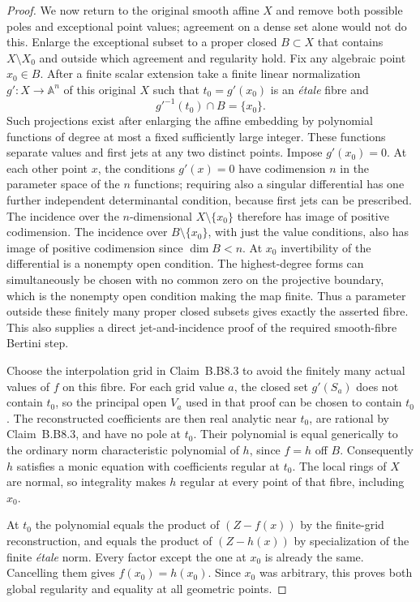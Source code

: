 \begin{proof}
We now return to the original smooth affine $X$ and remove both
possible poles and exceptional point values; agreement on a dense
set alone would not do this.  Enlarge the exceptional subset to a
proper closed $B\subset X$ that contains $X\setminus X_0$ and
outside which agreement and regularity hold.  Fix any algebraic
point $x_0\in B$.  After a finite scalar extension take a finite
linear normalization $g':X\to\mathbb A^n$ of this original $X$
such that
$t_0=g'(x_0)$ is an \emph{\'etale} fibre and
\[
                g'^{-1}(t_0)\cap B=\{x_0\}.
\]
Such projections exist after enlarging the affine embedding by
polynomial functions of degree at most a fixed sufficiently large
integer.  These functions separate values and first jets at any
two distinct points.  Impose $g'(x_0)=0$.  At each other point
$x$, the conditions $g'(x)=0$ have codimension $n$ in the
parameter space of the $n$ functions; requiring also a singular
differential has one further independent determinantal condition,
because first jets can be prescribed.  The incidence over the
$n$-dimensional $X\setminus\{x_0\}$ therefore has image of
positive codimension.  The incidence over $B\setminus\{x_0\}$,
with just the value conditions, also has image of positive
codimension since $\dim B<n$.  At $x_0$ invertibility of the
differential is a nonempty open condition.  The highest-degree
forms can simultaneously be chosen with no common zero on the
projective boundary, which is the nonempty open condition making
the map finite.  Thus a parameter outside these finitely many
proper closed subsets gives exactly the asserted fibre.  This
also supplies a direct jet-and-incidence proof of the required
smooth-fibre Bertini step.

Choose the interpolation grid in Claim~B.B8.3 to avoid the finitely
many actual values of $f$ on this fibre.  For each grid value $a$,
the closed set $g'(S_a)$ does not contain $t_0$, so the principal
open $V_a$ used in that proof can be chosen to contain $t_0$.
The reconstructed coefficients are then real analytic near $t_0$,
are rational by Claim~B.B8.3, and have no pole at $t_0$.
Their polynomial is equal generically to the ordinary norm
characteristic polynomial of $h$, since $f=h$ off $B$.
Consequently $h$ satisfies a monic equation with coefficients
regular at $t_0$.  The local rings of $X$ are normal, so integrality
makes $h$ regular at every point of that fibre, including $x_0$.

At $t_0$ the polynomial equals the product of $(Z-f(x))$ by the
finite-grid reconstruction, and equals the product of $(Z-h(x))$
by specialization of the finite \emph{\'etale} norm.  Every factor
except the one at $x_0$ is already the same.  Cancelling them gives
$f(x_0)=h(x_0)$.  Since $x_0$ was arbitrary, this proves both
global regularity and equality at all geometric points.
\end{proof}

